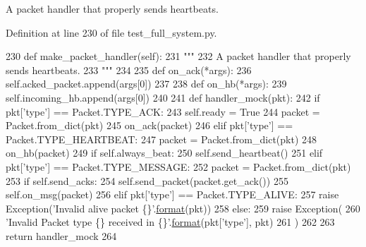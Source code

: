 \begin{DoxyVerb}A packet handler that properly sends heartbeats.
\end{DoxyVerb}
 

Definition at line 230 of file test\+\_\+full\+\_\+system.\+py.


\begin{DoxyCode}
230     \textcolor{keyword}{def }make\_packet\_handler(self):
231         \textcolor{stringliteral}{"""}
232 \textcolor{stringliteral}{        A packet handler that properly sends heartbeats.}
233 \textcolor{stringliteral}{        """}
234 
235         \textcolor{keyword}{def }on\_ack(*args):
236             self.acked\_packet.append(args[0])
237 
238         \textcolor{keyword}{def }on\_hb(*args):
239             self.incoming\_hb.append(args[0])
240 
241         \textcolor{keyword}{def }handler\_mock(pkt):
242             \textcolor{keywordflow}{if} pkt[\textcolor{stringliteral}{'type'}] == Packet.TYPE\_ACK:
243                 self.ready = \textcolor{keyword}{True}
244                 packet = Packet.from\_dict(pkt)
245                 on\_ack(packet)
246             \textcolor{keywordflow}{elif} pkt[\textcolor{stringliteral}{'type'}] == Packet.TYPE\_HEARTBEAT:
247                 packet = Packet.from\_dict(pkt)
248                 on\_hb(packet)
249                 \textcolor{keywordflow}{if} self.always\_beat:
250                     self.send\_heartbeat()
251             \textcolor{keywordflow}{elif} pkt[\textcolor{stringliteral}{'type'}] == Packet.TYPE\_MESSAGE:
252                 packet = Packet.from\_dict(pkt)
253                 \textcolor{keywordflow}{if} self.send\_acks:
254                     self.send\_packet(packet.get\_ack())
255                 self.on\_msg(packet)
256             \textcolor{keywordflow}{elif} pkt[\textcolor{stringliteral}{'type'}] == Packet.TYPE\_ALIVE:
257                 \textcolor{keywordflow}{raise} Exception(\textcolor{stringliteral}{'Invalid alive packet \{\}'}.\hyperlink{namespaceparlai_1_1chat__service_1_1services_1_1messenger_1_1shared__utils_a32e2e2022b824fbaf80c747160b52a76}{format}(pkt))
258             \textcolor{keywordflow}{else}:
259                 \textcolor{keywordflow}{raise} Exception(
260                     \textcolor{stringliteral}{'Invalid Packet type \{\} received in \{\}'}.\hyperlink{namespaceparlai_1_1chat__service_1_1services_1_1messenger_1_1shared__utils_a32e2e2022b824fbaf80c747160b52a76}{format}(pkt[\textcolor{stringliteral}{'type'}], pkt)
261                 )
262 
263         \textcolor{keywordflow}{return} handler\_mock
264 
\end{DoxyCode}
\mbox{\label{classparlai_1_1mturk_1_1core_1_1test_1_1test__full__system_1_1MockAgent_a2186b39ea12603dd9c80ca0fca2e6892}} 

